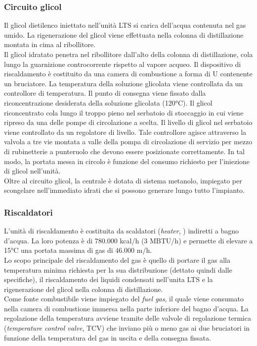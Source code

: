 \subsubsection*{Circuito glicol}
Il glicol dietilenco iniettato nell'unità LTS si carica dell'acqua contenuta nel gas umido. La rigenerazione del glicol viene effettuata nella colonna di distillazione montata in cima al ribollitore.\\
Il glicol idratato penetra nel ribollitore dall'alto della colonna di distillazione, cola lungo la guarnizione controcorrente rispetto al vapore acqueo. Il dispositivo di riscaldamento è costituito da una camera di combustione a forma di U contenente un bruciatore. La temperatura della soluzione glicolata viene controllata da un controllore di temperatura. Il punto di consegna viene fissato dalla riconcentrazione desiderata della soluzione glicolata (120°C). Il glicol riconcentrato cola lungo il troppo pieno nel serbatoio di stoccaggio in cui viene ripreso da una delle pompe di circolazione a scelta. Il livello di glicol nel serbatoio viene controllato da un regolatore di livello. Tale controllore agisce attraverso la valvola a tre vie montata a valle della pompa di circolazione di servizio per mezzo di rubinetterie a punteruolo che devono essere posizionate correttamente. In tal modo, la portata messa in circolo è funzione del consumo richiesto per l'iniezione di glicol nell'unità.\\
Oltre al circuito glicol, la centrale è dotata di sistema metanolo, impiegato per scongelare nell'immediato idrati che si possono generare lungo tutto l'impianto.

\subsubsection*{Riscaldatori}
L'unità di riscaldamento è costituita da scaldatori (\textit{heater}, ) indiretti a bagno d'acqua. La loro potenza è di 780.000 kcal/h (3 MBTU/h) e permette di elevare a 15°C una portata massima di gas di 46.000 m/h.\\
Lo scopo principale del riscaldamento del gas è quello di portare il gas alla temperatura minima richiesta per la sua distribuzione (dettato quindi dalle specifiche), il riscaldamento dei liquidi condensati nell'unita LTS e la rigenerazione del glicol nella colonna di distillazione.\\
Come fonte combustibile viene impiegato del \textit{fuel gas}, il quale viene consumato nella camera di combustione immersa nella parte inferiore del bagno d'acqua. La regolazione della temperatura avviene tramite delle valvole di regolazione termica (\textit{temperature control valve}, TCV) che inviano più o meno gas ai due bruciatori in funzione della temperatura del gas in uscita e della consegna fissata.

